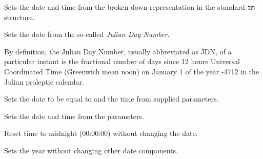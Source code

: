 
Sets the date and time from the broken down representation in the standard
{\tt tm} structure.


\label{wxdatetimesetjdn}


Sets the date from the so-called {\it Julian Day Number}.

By definition, the Julian Day Number, usually abbreviated as JDN, of a
particular instant is the fractional number of days since 12 hours Universal
Coordinated Time (Greenwich mean noon) on January 1 of the year -4712 in the
Julian proleptic calendar.


\label{wxdatetimesettime}


Sets the date to be equal to  and the time
from supplied parameters.


\label{wxdatetimesetdate}


Sets the date and time from the parameters.

\label{wxdatetimeresettime}


Reset time to midnight (00:00:00) without changing the date.

\label{wxdatetimesetyear}


Sets the year without changing other date components.

\label{wxdatetimesetmonth}

